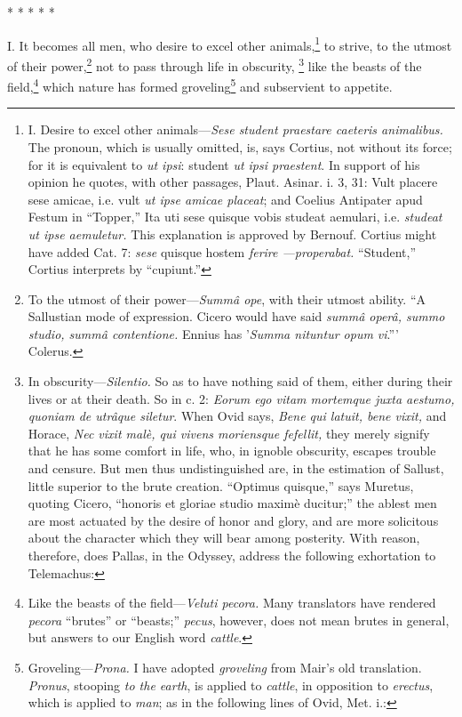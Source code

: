 * * * * *

I. It becomes all men, who desire to excel other animals,\footnote{I. Desire to excel other animals—\emph{Sese student praestare
caeteris animalibus.} The pronoun, which is usually omitted, is, says
Cortius, not without its force; for it is equivalent to \emph{ut ipsi}:
student \emph{ut ipsi praestent}. In support of his opinion he quotes, with
other passages, Plaut. Asinar. i. 3, 31: Vult placere sese amicae,
i.e. vult \emph{ut ipse amicae placeat}; and Coelius Antipater apud Festum
in ``Topper,'' Ita uti sese quisque vobis studeat aemulari, i.e.
\emph{studeat ut ipse aemuletur.} This explanation is approved by Bernouf.
Cortius might have added Cat. 7: \emph{sese} quisque hostem \emph{ferire
—properabat.} ``Student,'' Cortius interprets by ``cupiunt.''} to strive,
to the utmost of their power,\footnote{To the utmost of their power—\emph{Summâ ope}, with their utmost
ability. ``A Sallustian mode of expression. Cicero would have said
\emph{summâ operâ, summo studio, summâ contentione.} Ennius has '\emph{Summa
nituntur opum vi}.''' Colerus.} not to pass through life in obscurity,
\footnote{In obscurity—\emph{Silentio.} So as to have nothing said of them,
either during their lives or at their death. So in c. 2: \emph{Eorum ego
vitam mortemque juxta aestumo, quoniam de utrâque siletur}. When Ovid
says, \emph{Bene qui latuit, bene vixit,} and Horace, \emph{Nec vixit malè, qui
vivens moriensque fefellit,} they merely signify that he has some
comfort in life, who, in ignoble obscurity, escapes trouble and
censure. But men thus undistinguished are, in the estimation of
Sallust, little superior to the brute creation. ``Optimus quisque,''
says Muretus, quoting Cicero, ``honoris et gloriae studio maximè
ducitur;'' the ablest men are most actuated by the desire of honor and
glory, and are more solicitous about the character which they will
bear among posterity. With reason, therefore, does Pallas, in the
Odyssey, address the following exhortation to Telemachus:} like the beasts of the field,\footnote{Like the beasts of the field—\emph{Veluti pecora.} Many translators
have rendered \emph{pecora} ``brutes'' or ``beasts;'' \emph{pecus}, however, does
not mean brutes in general, but answers to our English word \emph{cattle}.} which nature has formed groveling\footnote{Groveling—\emph{Prona.} I have adopted \emph{groveling} from Mair's
old translation. \emph{Pronus}, stooping \emph{to the earth}, is applied to
\emph{cattle}, in opposition to \emph{erectus}, which is applied to \emph{man}; as
in the following lines of Ovid, Met. i.:}
and subservient to appetite.

